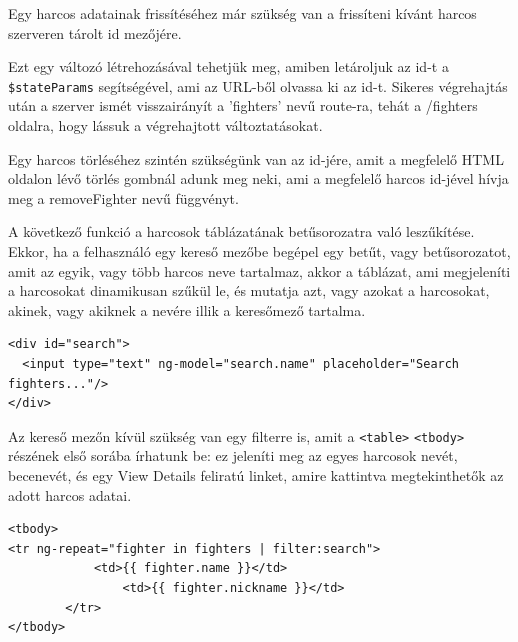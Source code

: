 Egy harcos adatainak frissítéséhez már szükség van a frissíteni kívánt harcos szerveren tárolt id mezőjére.


Ezt egy változó létrehozásával tehetjük meg, amiben letároljuk az id-t a \texttt{\$stateParams} segítségével, ami az URL-ből olvassa ki az id-t. Sikeres végrehajtás után a szerver ismét visszairányít a ’fighters’ nevű route-ra, tehát a /fighters oldalra, hogy lássuk a végrehajtott változtatásokat.

Egy harcos törléséhez szintén szükségünk van az id-jére, amit a megfelelő HTML oldalon lévő törlés gombnál adunk meg neki, ami a megfelelő harcos id-jével hívja meg a removeFighter nevű függvényt.


A következő funkció a harcosok táblázatának betűsorozatra való leszűkítése. Ekkor, ha a felhasználó egy kereső mezőbe begépel egy betűt, vagy betűsorozatot, amit az egyik, vagy több harcos neve tartalmaz, akkor a táblázat, ami megjeleníti a harcosokat dinamikusan szűkül le, és mutatja azt, vagy azokat a harcosokat, akinek, vagy akiknek a nevére illik a keresőmező tartalma.

\begin{verbatim}
<div id="search">
  <input type="text" ng-model="search.name" placeholder="Search fighters..."/>
</div>
\end{verbatim}

Az kereső mezőn kívül szükség van egy filterre is, amit a \texttt{<table>} \texttt{<tbody>} részének első sorába írhatunk be: ez jeleníti meg az egyes harcosok nevét, becenevét, és egy View Details feliratú linket, amire kattintva megtekinthetők az adott harcos adatai.

\begin{verbatim}
<tbody>
<tr ng-repeat="fighter in fighters | filter:search">
       		<td>{{ fighter.name }}</td>
        		<td>{{ fighter.nickname }}</td>
      	</tr>
</tbody>
\end{verbatim}

